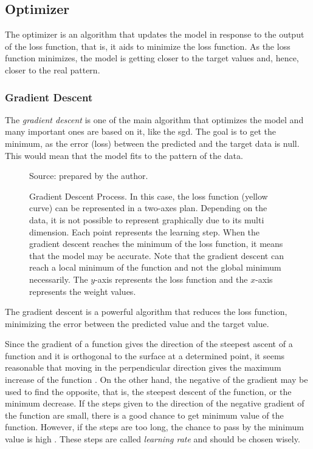 \subsection{Optimizer}\label{sec:optimizer}

The optimizer is an algorithm that updates the model in response to the output of the loss function, that is, it aids to minimize the loss function. 
As the loss function minimizes, the model is getting closer to the target values and, hence, closer to the real pattern.

\subsubsection*{Gradient Descent} 

The \emph{gradient descent} is one of the main algorithm \citep{nesterov2004} that optimizes the model and many important ones are based on it, like the \gls*{sgd}. The goal is to get the minimum, as the error (loss) between the predicted and the target data is null. This would mean that the model fits to the pattern of the data.
%
\begin{figure}[!htb]
    \centering
    \caption[Gradient Descent Process]{Gradient Descent Process. In this case, the loss function (yellow curve) can be represented in a two-axes plan. Depending on the data, it is not possible to represent graphically due to its multi dimension. Each point represents the learning step. When the gradient descent reaches the minimum of the loss function, it means that the model may be accurate. Note that the gradient descent can reach a local minimum of the function and not the global minimum necessarily. The \(y\)-axis represents the loss function and the \(x\)-axis represents the weight values.}
    
    
    {\footnotesize Source: prepared by the author.}
    
\end{figure}

The gradient descent is a powerful algorithm that reduces the loss function, minimizing the error between the predicted value and the target value.

Since the gradient of a function gives the direction of the steepest ascent of a function and it is orthogonal to the surface at a determined point, it seems reasonable that moving in the perpendicular direction gives the maximum increase of the function \citep{stewart2016}.
On the other hand, the negative of the gradient may be used to find the opposite, that is, the steepest descent of the function, or the minimum decrease.
If the steps given to the direction of the negative gradient of the function are small, there is a good chance to get minimum value of the function.
However, if the steps are too long, the chance to pass by the minimum value is high \citep{nielsen2015}.
These steps are called \emph{learning rate} and should be chosen wisely.


